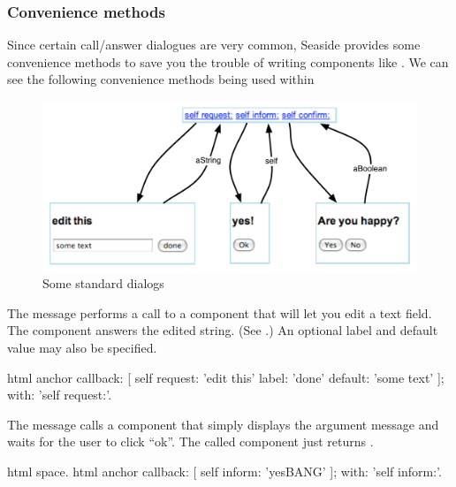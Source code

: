 \documentclass[a4paper,10pt,twoside]{book}
\begin{document}
\subsubsection{Convenience methods}

Since certain call/answer dialogues are very common, Seaside provides some convenience methods to save you the trouble of writing components like .
We can see the following convenience methods being used within 

\begin{figure}[ht]
\begin{center}
\includegraphics[width=\textwidth]{dialogs}
\caption{Some standard dialogs}
\label{fig:dialogs}
\end{center}
\end{figure}

The message  performs a call to a component that will let you edit a text field.
The component answers the edited string.
(See .)
An optional label and default value may also be specified.

\begin{code}{}
html anchor
	callback: [ self request: 'edit this' label: 'done' default: 'some text' ];
	with: 'self request:'.
\end{code}

The message  calls a component that simply displays the argument message and waits for the user to click ``ok''.
The called component just returns .

\begin{code}{}
html space.
html anchor
	callback: [ self inform: 'yesBANG' ];
	with: 'self inform:'.
\end{code}
\end{document}
